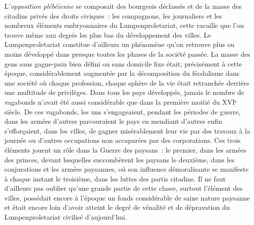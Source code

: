 \documentclass[french,twoside]{book} %
\begin{document}
L’\emph{opposition plébéienne} se composait des bourgeois déclassés et de la masse des citadins privés des droits civiques : les compagnons, les journaliers et les nombreux éléments embryonnaires du Lumpenproletariat, cette racaille que l’on trouve même aux degrés les plus bas du développement des villes. Le Lumpenproletariat constitue d’ailleurs un phénomène qu’on retrouve plus ou moins développé dans presque toutes les phases de la société passée. La masse des gens sans gagne-pain bien défini ou sans domicile fixe était, précisément à cette époque, considérablement augmentée par la décomposition du féodalisme dans une société où chaque profession, chaque sphère de la vie était retranchée derrière une multitude de privilèges. Dans tous les pays développés, jamais le nombre de vagabonds n’avait été aussi considérable que dans la première moitié du XVIᵉ siècle. De ces vagabonds, les uns s’engageaient, pendant les périodes de guerre, dans les armées d’autres parcouraient le pays en mendiant d’autres enfin s’efforçaient, dans les villes, de gagner misérablement leur vie par des travaux à la journée ou d’autres occupations non accaparées par des corporations. Ces trois éléments jouent un rôle dans la Guerre des paysans : le premier, dans les armées des princes, devant lesquelles succombèrent les paysans le deuxième, dans les conjurations et les armées paysannes, où son influence démoralisante se manifeste à chaque instant le troisième, dans les luttes des partis citadins. Il ne faut d’ailleurs pas oublier qu’une grande partie de cette classe, surtout l’élément des villes, possédait encore à l’époque un fonds considérable de saine nature paysanne et était encore loin d’avoir atteint le degré de vénalité et de dépravation du Lumpenproletariat civilisé d’aujourd’hui.\par
\end{document}
